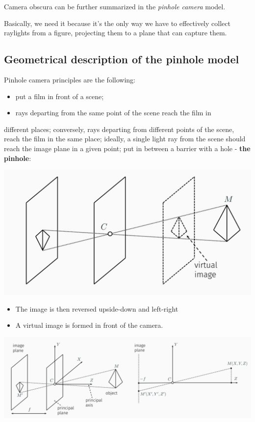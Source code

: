 \documentclass[10pt]{report}
\begin{document}
Camera obscura can be further summarized in the \emph{pinhole camera} model.

Basically, we need it because it's the only way we have to effectively
collect raylights from a figure, projecting them to a plane that can
capture them.

\subsection{Geometrical description of the pinhole model}
\label{geometrical-description-of-the-pinhole-model}
Pinhole camera principles are the following:

\begin{itemize}
\item put a film in front of a scene;
\item rays departing from the same point of the scene reach the film in
\end{itemize}
different places; conversely, rays departing from different points of
the scene, reach the film in the same place; ideally, a single light
ray from the scene should reach the image plane in a given point; put
in between a barrier with a hole - \textbf{the pinhole}:

\begin{center}
\includegraphics[width=.9\linewidth]{./pics/visio/pinhole1.jpg}
\end{center}

\begin{itemize}
\item The image is then reversed upside-down and left-right
\item A virtual image is formed in front of the camera.
\end{itemize}

\begin{center}
\includegraphics[width=.9\linewidth]{./pics/visio/pinhole2.jpg}
\end{center}
\end{document}
